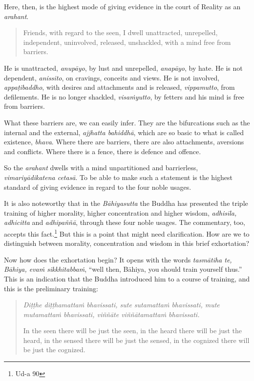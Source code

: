 Here, then, is the highest mode of giving evidence in the court of Reality as an \emph{arahant}.

\begin{quote}
Friends, with regard to the seen, I dwell unattracted, unrepelled, independent, uninvolved, released, unshackled, with a mind free from barriers.
\end{quote}

He is unattracted, \emph{anupāyo}, by lust and unrepelled, \emph{anapāyo}, by hate. He is not dependent, \emph{anissito}, on cravings, conceits and views. He is not involved, \emph{appaṭibaddho}, with desires and attachments and is released, \emph{vippamutto}, from defilements. He is no longer shackled, \emph{visaṁyutto}, by fetters and his mind is free from barriers.

What these barriers are, we can easily infer. They are the bifurcations such as the internal and the external, \emph{ajjhatta bahiddhā}, which are so basic to what is called existence, \emph{bhava}. Where there are barriers, there are also attachments, aversions and conflicts. Where there is a fence, there is defence and offence.

So the \emph{arahant} dwells with a mind unpartitioned and barrierless, \emph{vimariyādikatena cetasā}. To be able to make such a statement is the highest standard of giving evidence in regard to the four noble usages.

It is also noteworthy that in the \emph{Bāhiyasutta} the Buddha has presented the triple training of higher morality, higher concentration and higher wisdom, \emph{adhisīla, adhicitta} and \emph{adhipaññā}, through these four noble usages. The commentary, too, accepts this fact.\footnote{Ud-a 90} But this is a point that might need clarification. How are we to distinguish between morality, concentration and wisdom in this brief exhortation?

Now how does the exhortation begin? It opens with the words \emph{tasmātiha te, Bāhiya, evaṁ sikkhitabbaṁ}, ``well then, Bāhiya, you should train yourself thus.'' This is an indication that the Buddha introduced him to a course of training, and this is the preliminary training:

\begin{quote}
\emph{Diṭṭhe diṭṭhamattaṁ bhavissati, sute sutamattaṁ bhavissati, mute mutamattaṁ bhavissati, viññāte viññātamattaṁ bhavissati.}

In the seen there will be just the seen, in the heard there will be just the heard, in the sensed there will be just the sensed, in the cognized there will be just the cognized.
\end{quote}


